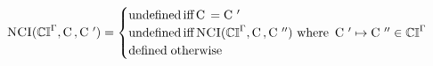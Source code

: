 \documentclass{article}
\begin{document}
\begin{math}
  \text{\sc NCI}(\mathbb{CI}^{\Gamma}, \mathop{\textrm{C}}\,, \mathop{\textrm{C}}\,') =
  \begin{cases}
    \text{undefined} \mathop{\text{iff}} \mathop{\textrm{C}}\, = \mathop{\textrm{C}}\,' \\ 
    \text{undefined} \mathop{\text{iff}} \text{\sc NCI}(\mathbb{CI}^{\Gamma}, \mathop{\textrm{C}}\,, \mathop{\textrm{C}}\,'')
      \text{ where } \mathop{\textrm{C}}\,' \mapsto \mathop{\textrm{C}}\,'' \in \mathbb{CI}^{\Gamma} \\ 
    \text{defined} \; \textrm{otherwise}  
  \end{cases}
\end{math}
\end{document}
